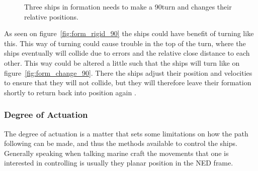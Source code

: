 \begin{figure}[htbp]
	\centering
	
	\caption{Three ships in formation needs to make a 90\textdegree turn and changes their relative positions.}
	\label{fig:form_change_90}
\end{figure}

As seen on figure~\vref{fig:form_rigid_90} the ships could have benefit of turning like this. This way of turning could cause trouble in the top of the turn, where the ships eventually will collide due to errors and the relative close distance to each other. This way could be altered a little such that the ships will turn like on figure~\vref{fig:form_change_90}. There the ships adjust their position and velocities to ensure that they will not collide, but they will therefore leave their formation shortly to return back into position again \citep{thorvaldsen}.

\subsubsection{Degree of Actuation}
The degree of actuation is a matter that sets some limitations on how
the path following can be made, and thus the methods available to
control the ships. Generally speaking when talking marine craft the movements
that one is interested in controlling is usually they planar position in
the \ac{NED} frame.

